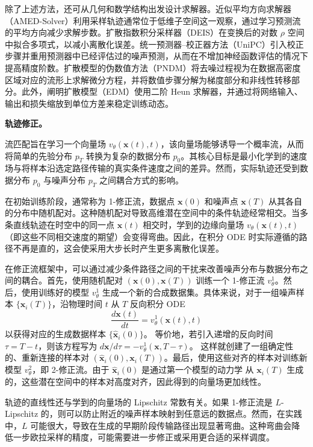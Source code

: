 \documentclass[UTF8,a4paper,zihao=-4,oneside,openany]{ctexbook}
\begin{document}
除了上述方法，还可从几何和数学结构出发设计求解器。近似平均方向求解器（AMED-Solver）利用采样轨迹通常位于低维子空间这一观察，通过学习预测流的平均方向减少求解步数。扩散指数积分采样器（DEIS）在变换后的对数 $\rho$ 空间中拟合多项式，以减小离散化误差。统一预测器--校正器方法（UniPC）引入校正步骤并重用预测器中已经评估过的噪声预测，从而在不增加神经函数评估的情况下提高精度阶数。扩散模型的伪数值方法（PNDM）将去噪过程视为在数据高密度区域对应的流形上求解微分方程，并将数值步骤分解为梯度部分和非线性转移部分。此外，阐明扩散模型（EDM）使用二阶 Heun 求解器，并通过将网络输入、输出和损失缩放到单位方差来稳定训练动态。

\textbf{轨迹修正。}

流匹配旨在学习一个向量场 $v_\theta(\mathbf{x}(t), t)$，该向量场能够诱导一个概率流，从而将简单的先验分布 $p_T$ 转换为复杂的数据分布 $p_0$。其核心目标是最小化学到的速度场与将样本沿选定路径传输的真实条件速度之间的差异。然而，实际轨迹还受到数据分布 $p_0$ 与噪声分布 $p_T$ 之间耦合方式的影响。

在初始训练阶段，通常称为 1-修正流，数据点 $\mathbf{x}(0)$ 和噪声点 $\mathbf{x}(T)$ 从其各自的分布中随机配对。这种随机配对导致高维潜在空间中的条件轨迹经常相交。当多条直线轨迹在时空中的同一点 $\mathbf{x}(t)$ 相交时，学到的边缘向量场 $v_\theta(\mathbf{x}(t), t)$（即这些不同相交速度的期望）会变得弯曲。因此，在积分 ODE 时实际遵循的路径不再是直的，这会使采用大步长时产生更多离散化误差。

在修正流框架中，可以通过减少条件路径之间的干扰来改善噪声分布与数据分布之间的耦合。首先，使用随机配对 $(\mathbf{x}(0), \mathbf{x}(T))$ 训练一个 1-修正流 $v_{\theta}^1$。然后，使用训练好的模型 $v_{\theta}^1$ 生成一个新的合成数据集。具体来说，对于一组噪声样本 $\{\mathbf{x}_i(T)\}$，沿物理时间 $t$ 从 $T$ 反向积分 ODE
\[
\frac{d\mathbf{x}(t)}{dt}=v_{\theta}^1(\mathbf{x}(t),t)
\]
以获得对应的生成数据样本 $\{\hat{\mathbf{x}}_i(0)\}$。
等价地，若引入递增的反向时间 $\tau=T-t$，则该方程写为
$d\mathbf{x}/d\tau=-v_{\theta}^1(\mathbf{x},T-\tau)$。
这样就创建了一组确定性的、重新连接的样本对
$(\hat{\mathbf{x}}_i(0), \mathbf{x}_i(T))$。最后，使用这些对齐的样本对训练新模型
$v_{\theta}^2$，即 2-修正流。由于 $\hat{\mathbf{x}}_i(0)$ 是通过第一个模型的动力学
从 $\mathbf{x}_i(T)$ 生成的，这些潜在空间中的样本对高度对齐，因此得到的向量场更加线性。

轨迹的直线性还与学到的向量场的 Lipschitz 常数有关。如果 1-修正流是 $L$-Lipschitz 的，则可以防止附近的噪声样本映射到任意远的数据点。然而，在实践中，$L$ 可能很大，导致在生成的早期阶段传输路径出现显著弯曲。这种弯曲会降低一步欧拉采样的精度，可能需要进一步修正或采用更合适的采样调度。
\end{document}
